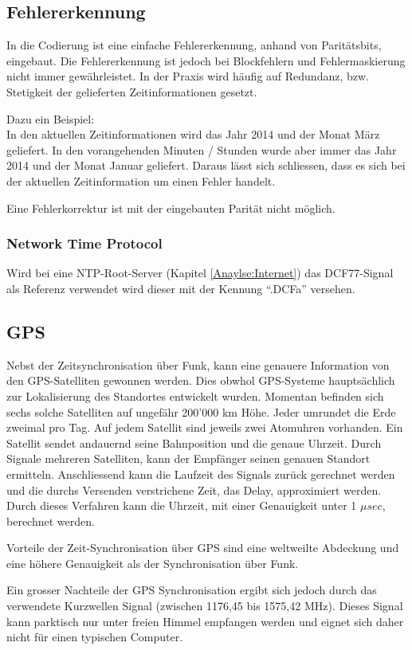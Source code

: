 \subsection{Fehlererkennung}
In die Codierung ist eine einfache Fehlererkennung, anhand von Paritätsbits, eingebaut. Die Fehlererkennung ist jedoch bei Blockfehlern und Fehlermaskierung nicht immer gewährleistet. In der Praxis wird häufig auf Redundanz, bzw. Stetigkeit der gelieferten Zeitinformationen gesetzt.

Dazu ein Beispiel:\\
In den aktuellen Zeitinformationen wird das Jahr 2014 und der Monat März geliefert. In den vorangehenden Minuten / Stunden wurde aber immer das Jahr 2014 und der Monat Januar geliefert. Daraus lässt sich schliessen, dass es sich bei der aktuellen Zeitinformation um einen Fehler handelt.

Eine Fehlerkorrektur ist mit der eingebauten Parität nicht möglich.

\subsubsection{Network Time Protocol}
Wird bei eine NTP-Root-Server (Kapitel \ref{Anaylse:Internet}) das DCF77-Signal als Referenz verwendet wird dieser mit der Kennung "`.DCFa"' versehen.

\subsection{GPS}
Nebst der Zeitsynchronisation über Funk, kann eine genauere Information von den GPS-Satelliten gewonnen werden. Dies obwhol GPS-Systeme hauptsächlich zur Lokalisierung des Standortes entwickelt wurden.
Momentan befinden sich sechs solche Satelliten auf ungefähr 200'000 km Höhe. Jeder umrundet die Erde zweimal pro Tag. Auf jedem Satellit sind jeweils zwei Atomuhren vorhanden.
Ein Satellit sendet andauernd seine Bahnposition und die genaue Uhrzeit. Durch Signale mehreren Satelliten, kann der Empfänger seinen genauen Standort ermitteln.
Anschliessend kann die Laufzeit des Signals zurück gerechnet werden und die durchs Versenden verstrichene Zeit, das Delay, approximiert werden.
Durch dieses Verfahren kann die Uhrzeit, mit einer Genauigkeit unter 1 ${\mu}sec$, berechnet werden.

Vorteile der Zeit-Synchronisation über GPS sind eine weltweilte Abdeckung und eine höhere Genauigkeit als der Synchronisation über Funk.

Ein grosser Nachteile der GPS Synchronisation ergibt sich jedoch durch das verwendete Kurzwellen Signal (zwischen 1176,45 bis 1575,42 MHz). Dieses Signal kann parktisch nur unter freien Himmel empfangen werden und eignet sich daher nicht für einen typischen Computer.

